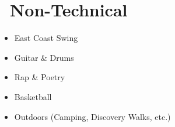 \documentclass{resume}
\begin{document}
\section{\faPaintBrush\ Non-Technical}
\begin{itemize}
\item East Coast Swing
\item Guitar \& Drums
\item Rap \& Poetry
\item Basketball
\item Outdoors (Camping, Discovery Walks, etc.)
\end{itemize}
\begin{comment}
\begin{itemize}
  \item \textbf{East Coast Swing}:\par 
  ``It don't mean a thing if it ain't got that swing" - Irving Mills. This dance form makes it worth getting your two left feet right.
  \item \textbf{Guitar and Drums}:\par
  Whether it's playing in front of scores at church or a handful around a bonfire, the jamming experience is truly revitalizing.
  \item \textbf{Discovery Outings}:\par 
  Curiosity outdoors gets the best of me, even when it's `just' another trail that I've spotted. Adventure always awaits.
  \item \textit{\textbf{Naruto Shippuden}}:\par 
  The sheer number of life lessons I've learned from this anime alone is phenomenal. I remain unashamed and a child at heart forever.
  \item \textbf{Rap and Poetry}:\par 
  Words. They're mighty weighty. And the potential for good art to flow from them is why I've come to appreciate and experiment with rap.
\end{itemize}
\end{comment}
\nspace{}
\end{document}
